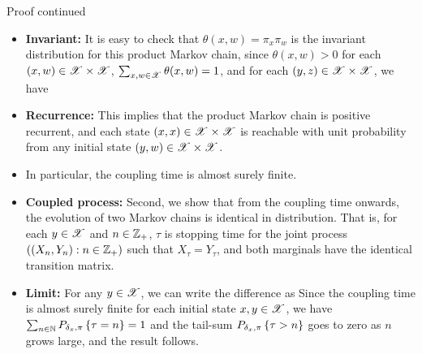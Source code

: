 \documentclass[12pt,aspectratio=169]{beamer}
\begin{document}
\begin{frame}
\begin{block}{Proof continued}
\begin{itemize}
\item \textbf{Invariant:} It is easy to check that $\theta(x,w) = \pi_x\pi_{w}$ is the invariant distribution for this product Markov chain, since $\theta(x,w) > 0$ for each $(x,w) \in \mathscr{X} \times \mathscr{X}$, $\sum_{x,w \in \mathscr{X}}\theta(x,w) = 1$, and for each $(y,z) \in \mathscr{X} \times \mathscr{X}$, we have 
\item<2-> \textbf{Recurrence:} This implies that the product Markov chain is positive recurrent, and each state $(x,x) \in \mathscr{X} \times \mathscr{X}$ is reachable with unit probability from any initial state $(y,w) \in \mathscr{X} \times \mathscr{X}$.  
\item<2-> In particular, the coupling time is almost surely finite. 
\end{itemize}
\end{block}
\end{frame}

\begin{frame}
\begin{Proof}
\begin{itemize}
\item \textbf{Coupled process:} Second, we show that from the coupling time onwards, the evolution of two Markov chains is identical in distribution.  
That is, for each $y \in \mathscr{X}$ and $n \in \mathbb{Z}_+$, 
$\tau$ is stopping time for the joint process $((X_n, Y_n): n \in \mathbb{Z}_+)$ such that $X_\tau = Y_\tau$, 
and both marginals  have the identical transition matrix.\\ %

\item<2->
\textbf{Limit:} For any $y \in \mathscr{X}$, we can write the difference as 
Since the coupling time is almost surely finite for each initial state $x,y \in \mathscr{X}$, 
we have $\sum_{n \in \mathbb{N}}P_{\delta_x,\pi}\left\{\tau = n\right\} = 1$ and the tail-sum $P_{\delta_x,\pi}\left\{\tau > n\right\}$ goes to zero as $n$ grows large, and the result follows. 
\end{itemize}
\end{Proof}
\end{frame}
\end{document}
